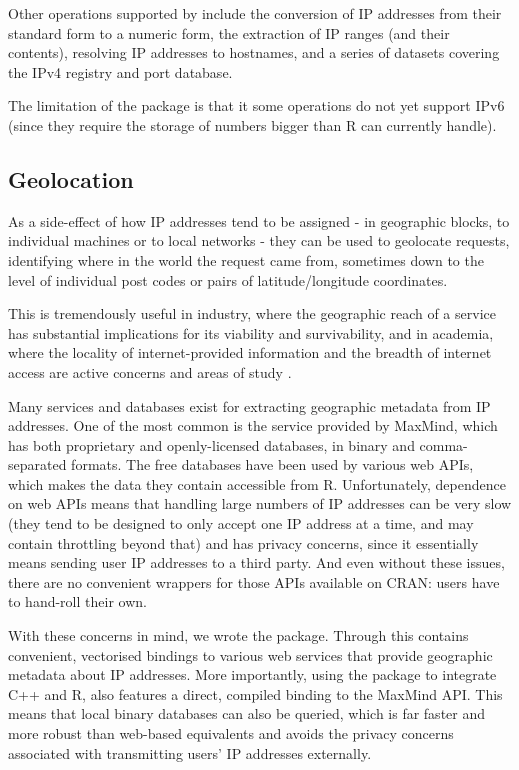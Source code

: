 Other operations supported by  include the conversion of IP
addresses from their standard  form to a numeric
form, the extraction of IP ranges (and their contents), resolving IP
addresses to hostnames, and a series of datasets covering the IPv4
registry and port database.

The limitation of the package is that it some operations do not yet
support IPv6 (since they require the storage of numbers bigger than R
can currently handle).

\subsection{Geolocation}\label{geolocation}

As a side-effect of how IP addresses tend to be assigned - in geographic
blocks, to individual machines or to local networks - they can be used
to geolocate requests, identifying where in the world the request came
from, sometimes down to the level of individual post codes or pairs of
latitude/longitude coordinates.

This is tremendously useful in industry, where the geographic reach of a
service has substantial implications for its viability and
survivability, and in academia, where the locality of internet-provided
information and the breadth of internet access are active concerns and
areas of study \citep{barriers}.

Many services and databases exist for extracting geographic metadata
from IP addresses. One of the most common is the service provided by
MaxMind, which has both proprietary and openly-licensed databases, in
binary and comma-separated formats. The free databases have been used by
various web APIs, which makes the data they contain accessible from R.
Unfortunately, dependence on web APIs means that handling large numbers
of IP addresses can be very slow (they tend to be designed to only
accept one IP address at a time, and may contain throttling beyond that)
and has privacy concerns, since it essentially means sending user IP
addresses to a third party. And even without these issues, there are no
convenient wrappers for those APIs available on CRAN: users have to
hand-roll their own.

With these concerns in mind, we wrote the 
\citep{rgeolocate} package. Through  this contains convenient,
vectorised bindings to various web services that provide geographic
metadata about IP addresses. More importantly, using the 
package to integrate C++ and R,  also features a direct,
compiled binding to the MaxMind API. This means that local binary
databases can also be queried, which is far faster and more robust than
web-based equivalents and avoids the privacy concerns associated with
transmitting users' IP addresses externally.


